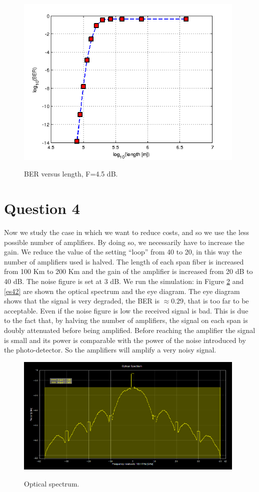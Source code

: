 \documentclass[a4paper,10pt]{report}
\begin{document}
\begin{figure}[!ht]
   \centering
   \includegraphics[width=11cm]{es3.png}\\
   \caption{BER versus length, F=4.5 dB.}
   \label{es3}
\end{figure}


\newpage
\section*{Question 4}
Now we study the case in which we want to reduce costs, and so we use the less possible number of amplifiers.
By doing so, we necessarily have to increase the gain.
 We reduce the value of the setting ``loop'' from 40 to 20, in this way the number of amplifiers used is halved.
 The length of each span fiber is increased from 100 Km to 200 Km and the gain of the amplifier is increased from 20 dB to 40 dB.
 The noise figure is set at 3 dB.
 We run the simulation: in Figure \ref{es41} and \ref{es42} are shown the optical spectrum and the eye diagram.
 The eye diagram shows that the signal is very degraded, the BER is $\approx 0.29$, that is too far to be acceptable.
Even if the noise figure is low the received signal is bad. This is due to the fact that, by halving the number of amplifiers,
the signal on each span is doubly attenuated before being amplified. Before reaching the amplifier the signal is small
and its power is comparable with the power of the noise introduced by the photo-detector.
So the amplifiers will amplify a very noisy signal.

\begin{figure}[!ht]
   \centering
   \includegraphics[width=11cm]{es41.png}\\
   \caption{Optical spectrum.}
   \label{es41}
\end{figure}
\end{document}
